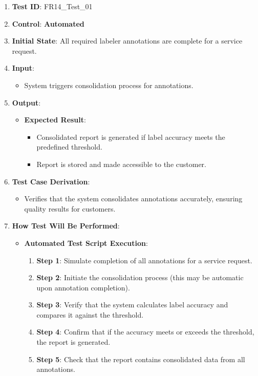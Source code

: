 \documentclass[12pt, titlepage]{article}
\begin{document}
\begin{enumerate}
    \item \textbf{Test ID}: FR14\_Test\_01
    \item \textbf{Control}: \textbf{Automated}
    \item \textbf{Initial State}: All required labeler annotations are complete for a service request.
    \item \textbf{Input}:
    \begin{itemize}
        \item System triggers consolidation process for annotations.
    \end{itemize}
    \item \textbf{Output}:
    \begin{itemize}
        \item \textbf{Expected Result}:
        \begin{itemize}
            \item Consolidated report is generated if label accuracy meets the predefined threshold.
            \item Report is stored and made accessible to the customer.
        \end{itemize}
    \end{itemize}
    \item \textbf{Test Case Derivation}:
    \begin{itemize}
        \item Verifies that the system consolidates annotations accurately, ensuring quality results for customers.
    \end{itemize}
    \item \textbf{How Test Will Be Performed}:
    \begin{itemize}
        \item \textbf{Automated Test Script Execution}:
        \begin{enumerate}
            \item \textbf{Step 1}: Simulate completion of all annotations for a service request.
            \item \textbf{Step 2}: Initiate the consolidation process (this may be automatic upon annotation completion).
            \item \textbf{Step 3}: Verify that the system calculates label accuracy and compares it against the threshold.
            \item \textbf{Step 4}: Confirm that if the accuracy meets or exceeds the threshold, the report is generated.
            \item \textbf{Step 5}: Check that the report contains consolidated data from all annotations.

\end{enumerate}
\end{itemize}
\end{enumerate}
\end{document}
